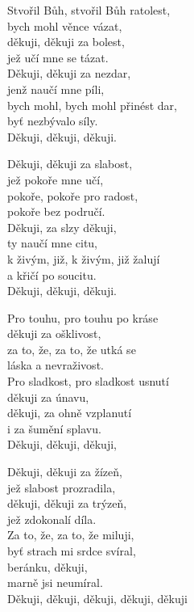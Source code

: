 
\ve{}
Stvořil Bůh, stvořil Bůh ratolest,\\
bych mohl věnce vázat,\\
děkuji, děkuji za bolest,\\
jež učí mne se tázat.\\
Děkuji, děkuji za nezdar,\\
jenž naučí mne píli,\\
bych mohl, bych mohl přinést dar,\\
byť nezbývalo síly.\\
Děkuji, děkuji, děkuji.

\ve{}
Děkuji, děkuji za slabost,\\
jež pokoře mne učí,\\
pokoře, pokoře pro radost,\\
pokoře bez područí.\\
Děkuji, za slzy děkuji,\\
ty naučí mne citu,\\
k živým, již, k živým, již žalují\\
a křičí po soucitu.\\
Děkuji, děkuji, děkuji.

\ve{}
Pro touhu, pro touhu po kráse\\
děkuji za ošklivost,\\
za to, že, za to, že utká se\\
láska a nevraživost.\\
Pro sladkost, pro sladkost usnutí\\
děkuji za únavu,\\
děkuji, za ohně vzplanutí\\
i za šumění splavu.\\
Děkuji, děkuji, děkuji,

\ve{}
Děkuji, děkuji za žízeň,\\
jež slabost prozradila,\\
děkuji, děkuji za trýzeň,\\
jež zdokonalí díla.\\
Za to, že, za to, že miluji,\\
byť strach mi srdce svíral,\\
beránku, děkuji,\\
marně jsi neumíral.\\
Děkuji, děkuji, děkuji, děkuji, děkuji

\esong